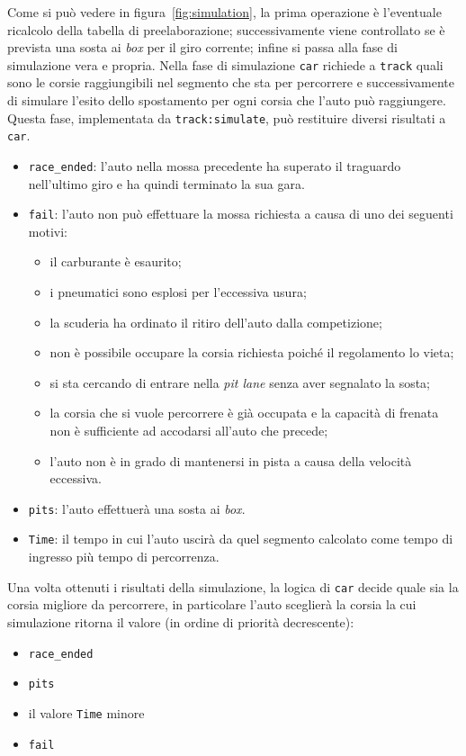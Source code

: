 \documentclass[11pt,a4paper]{report}
\newcommand{\fun}[1]{\texttt{#1}}
\begin{document}
Come si può vedere in figura~\ref{fig:simulation}, la prima operazione è l'eventuale ricalcolo della tabella di preelaborazione; successivamente viene controllato se è prevista una sosta ai \textit{box} per il giro corrente; infine si passa alla fase di simulazione vera e propria. Nella fase di simulazione \texttt{car} richiede a \texttt{track} quali sono le corsie raggiungibili nel segmento che sta per percorrere e successivamente di simulare l'esito dello spostamento per ogni corsia che l'auto può raggiungere. Questa fase, implementata da \fun{track:simulate}, può restituire diversi risultati a \texttt{car}.
\begin{itemize}
\item \texttt{race\_ended}: l'auto nella mossa precedente ha superato il traguardo nell'ultimo giro e ha quindi terminato la sua gara.
\item \texttt{fail}: l'auto non può effettuare la mossa richiesta a causa di uno dei seguenti motivi:
	\begin{itemize}
	\item il carburante è esaurito;
	\item i pneumatici sono esplosi per l'eccessiva usura;
	\item la scuderia ha ordinato il ritiro dell'auto dalla competizione;
	\item non è possibile occupare la corsia richiesta poiché il regolamento lo vieta;
	\item si sta cercando di entrare nella \textit{pit lane} senza aver segnalato la sosta;
	\item la corsia che si vuole percorrere è già occupata e la capacità di frenata non è sufficiente ad accodarsi all'auto che precede;
	\item l'auto non è in grado di mantenersi in pista a causa della velocità eccessiva.
	\end{itemize}
\item \texttt{pits}: l'auto effettuerà una sosta ai \textit{box}.
\item \texttt{Time}: il tempo in cui l'auto uscirà da quel segmento calcolato come tempo di ingresso più tempo di percorrenza.
\end{itemize}
Una volta ottenuti i risultati della simulazione, la logica di \texttt{car} decide quale sia la corsia migliore da percorrere, in particolare l'auto sceglierà la corsia la cui simulazione ritorna il valore (in ordine di priorità decrescente):
\begin{itemize}
\item \texttt{race\_ended}
\item \texttt{pits}
\item il valore \texttt{Time} minore
\item \texttt{fail}
\end{itemize}
\end{document}
